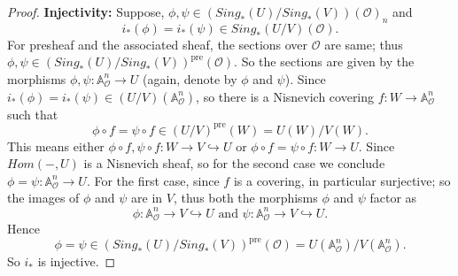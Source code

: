 \documentclass[11pt, reqno]{amsart}
\theoremstyle{plain}
\theoremstyle{definition}
\begin{document}
\begin{proof}
\textbf{Injectivity:} Suppose, $\phi, \psi \in (Sing_*(U)/Sing_*(V))(\mathcal{O})_n$ and 
$$i_*(\phi) = i_*(\psi) \in Sing_*(U/V)(\mathcal{O}).$$ 
For presheaf and the associated sheaf, the sections over $\mathcal{O}$ are same; thus $\phi, \psi \in (Sing_*(U)/Sing_*(V))^{\text{pre}}(\mathcal{O})$. So the sections are given by the morphisms $\phi, \psi: \mathbb{A}^n_{\mathcal{O}} \to U$ (again, denote by $\phi$ and $\psi$). 
Since $i_*(\phi) = i_*(\psi) \in (U/V)(\mathbb{A}^n_{\mathcal{O}})$, so there is a Nisnevich covering $f: W \to \mathbb{A}^n_{\mathcal{O}}$ such that 
$$\phi \circ f = \psi \circ f \in (U/V)^{\text{pre}}(W) = U(W)/V(W).$$
This means either $\phi \circ f, \psi \circ f: W \to V \hookrightarrow U$ or $\phi \circ f = \psi \circ f: W \to U$.
Since $Hom(-, U)$ is a Nisnevich sheaf, so for the second case we conclude $\phi = \psi: \mathbb{A}^n_{\mathcal{O}} \to U$. For the first case, since $f$ is a covering, in particular surjective; so the images of $\phi$ and $\psi$ are in $V$, thus both the morphisms $\phi$ and $\psi$ factor as
$$\phi: \mathbb{A}^n_{\mathcal{O}} \to V \hookrightarrow U \text{ and } \psi: \mathbb{A}^n_{\mathcal{O}} \to V \hookrightarrow U.$$
Hence 
$$\phi = \psi \in (Sing_*(U)/Sing_*(V))^{\text{pre}}(\mathcal{O}) = U(\mathbb{A}^n_{\mathcal{O}})/V(\mathbb{A}^n_{\mathcal{O}}).$$
So $i_*$ is injective.


\end{proof}
\end{document}
